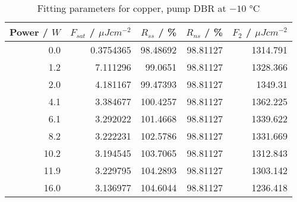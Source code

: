 \begin{table}[H]
\caption{Fitting parameters for copper, pump DBR at $-10$ °C}
\begin{tabular}{rrrrr}
\toprule
Power / $W$ & $F_{sat}$ / $\mu Jcm^{-2}$ & $R_{ss}$ / \% & $R_{ns}$ / \% & $F_2$ / $\mu Jcm^{-2}$ \\
\midrule
0.0 & 0.3754365 & 98.48692 & 98.81127 & 1314.791 \\
1.2 & 7.111296 & 99.0651 & 98.81127 & 1328.366 \\
2.0 & 4.181167 & 99.47393 & 98.81127 & 1349.31 \\
4.1 & 3.384677 & 100.4257 & 98.81127 & 1362.225 \\
6.1 & 3.292022 & 101.4668 & 98.81127 & 1339.622 \\
8.2 & 3.222231 & 102.5786 & 98.81127 & 1331.669 \\
10.2 & 3.194545 & 103.7065 & 98.81127 & 1312.843 \\
11.9 & 3.229795 & 104.2893 & 98.81127 & 1303.142 \\
16.0 & 3.136977 & 104.6044 & 98.81127 & 1236.418 \\
\bottomrule
\end{tabular}
\end{table}
